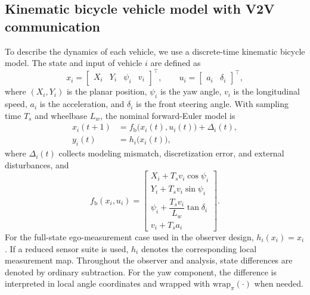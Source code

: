 \documentclass[letterpaper,journal]{IEEEtran}
\begin{document}
\subsection{Kinematic bicycle vehicle model with V2V communication}
To describe the dynamics of each vehicle, we use a discrete-time kinematic bicycle model. The state and input of vehicle $i$ are defined as
\begin{equation*}
    x_i=\begin{bmatrix}X_i&Y_i&\psi_i&v_i\end{bmatrix}^{\top},
    \qquad
    u_i=\begin{bmatrix}a_i&\delta_i\end{bmatrix}^{\top},
\end{equation*}
where $(X_i,Y_i)$ is the planar position, $\psi_i$ is the yaw angle, $v_i$ is the longitudinal speed, $a_i$ is the acceleration, and $\delta_i$ is the front steering angle. With sampling time $T_s$ and wheelbase $L_w$, the nominal forward-Euler model is
\begin{equation}\label{v_i}
    \begin{aligned}
        x_i(t+1) &= f_{\text{b}}\big(x_i(t),u_i(t)\big)+\Delta_i(t),\\
        y_i(t) &= h_i\big(x_i(t)\big),
    \end{aligned}
\end{equation}
where $\Delta_i(t)$ collects modeling mismatch, discretization error, and external disturbances, and
\begin{equation}
f_{\text{b}}(x_i,u_i)=
\begin{bmatrix}
X_i+T_s v_i\cos\psi_i\\
Y_i+T_s v_i\sin\psi_i\\
\psi_i+\dfrac{T_s v_i}{L_w}\tan\delta_i\\
v_i+T_s a_i
\end{bmatrix}.
\label{eq_bicycle_map}
\end{equation}
For the full-state ego-measurement case used in the observer design, $h_i(x_i)=x_i$. If a reduced sensor suite is used, $h_i$ denotes the corresponding local measurement map.
Throughout the observer and analysis, state differences are denoted by ordinary subtraction. For the yaw component, the difference is interpreted in local angle coordinates and wrapped with $\mathrm{wrap}_{\pi}(\cdot)$ when needed.
\end{document}
